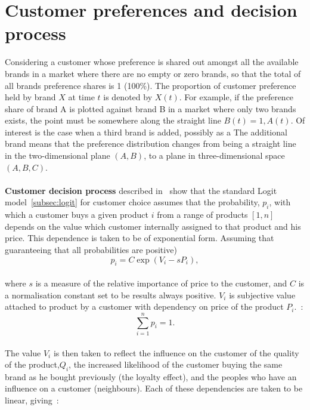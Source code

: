 \section{Customer preferences and decision process} \label{sec:customer_preferences}
Considering a customer whose preference is shared out amongst all the available brands in a market where there are no empty or zero brands,
so that the total of all brands preference shares is 1 (100\%).
The proportion of customer preference held by brand $X$ at time $t$ is denoted by $X(t)$.
For example, if the preference share of brand A is plotted against brand B in a market where only two brands exists,
the point must be somewhere along the straight line $B(t) = 1, A(t)$.
Of interest is the case when a third brand is added, possibly as a
The additional brand means that the preference distribution changes from being a straight line in the two-dimensional plane $(A, B)$,
to a plane in three-dimensional space $(A, B, C)$.\\
\\
\textbf{Customer decision process} \label{sec:cus_decision} described in~\cite{patel} show that the standard Logit model~\ref{subsec:logit} for customer choice assumes that
the probability, $p_i$, with which a customer buys a given product $i$ from a range of products $[1, n]$ depends on
the value which customer internally assigned to that product and his price.
This dependence is taken to be of exponential form.
Assuming that guaranteeing that all probabilities are positive)
\\
\begin{equation} \label{eq:9}
p_i = C\exp(V_i - sP_i),
\end{equation}
\\
where $s$ is a measure of the relative importance of price to the customer, and $C$ is a normalisation constant set to be results always positive. $V_i$ is subjective value
attached to product by a customer with dependency on price of the product $P_i$.~\cite{patel}:
\\
\begin{equation} \label{eq:10}
\sum_{i=1}^n p_i = 1.
\end{equation}
\\
The value $V_i$ is then taken to reflect the influence on the customer of the quality of the product,$Q_i$,
the increased likelihood of the customer buying the same brand as he bought previously (the loyalty effect),
and the peoples who have an influence on a customer (neighbours).
Each of these dependencies are taken to be linear, giving~\cite{patel}:
